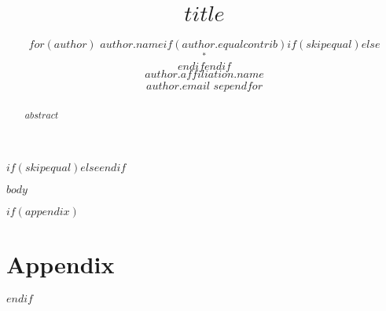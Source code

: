 \documentclass{article}
\title{$title$}
\author{%
$for(author)$%
$author.name$$if(author.equalcontrib)$$if(skipequal)$$else$$$^\ast$$$endif$$endif$\\
$author.affiliation.name$\\
\texttt{$author.email$}
$sep$\And$endfor$%
}
\begin{document}
\maketitle

$if(skipequal)$$else$$endif$

\begin{abstract}
$abstract$
\end{abstract}

$body$




$if(appendix)$
\appendix
\section{Appendix}

$endif$
\end{document}
